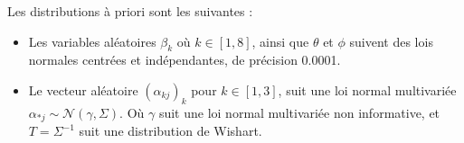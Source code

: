     Les distributions à priori sont les suivantes : 
    \begin{itemize}
        \item Les variables aléatoires $\beta_k$ où $k \in [1,8]$, ainsi que $\theta$ et $\phi$ suivent des lois normales centrées et indépendantes, de précision 0.0001.
        \item Le vecteur aléatoire $(\alpha_{kj})_k$ pour $k \in [1,3]$, suit une loi normal multivariée $\alpha_{*j} \sim \mathcal{N}( \gamma, \Sigma)$. Où $\gamma$ suit une loi normal multivariée non informative, et $T = \Sigma^{-1}$ suit une distribution de Wishart.
    \end{itemize}
 